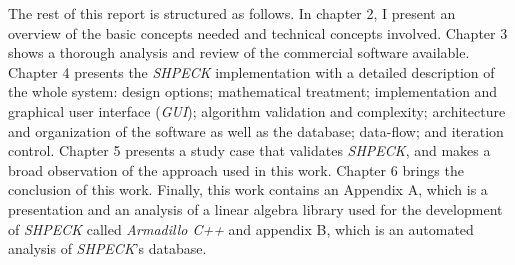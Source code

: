 The rest of this report is structured as follows. In chapter 2, I present an overview of the basic concepts needed and technical concepts involved. Chapter 3 shows a thorough analysis and review of the commercial software available. Chapter 4 presents the \emph{SHPECK} implementation with a detailed description of the whole system: design options; mathematical treatment; implementation and graphical user interface (\emph{GUI}); algorithm validation and complexity; architecture and organization of the software as well as the database; data-flow; and iteration control. Chapter 5 presents a study case that validates \emph{SHPECK}, and makes a broad observation of the approach used in this work. Chapter 6 brings the conclusion of this work. Finally, this work contains an Appendix A, which is a presentation and an analysis of a linear algebra library used for the development of \emph{SHPECK} called \emph{Armadillo C++} and appendix B, which is an automated analysis of \emph{SHPECK}'s database.